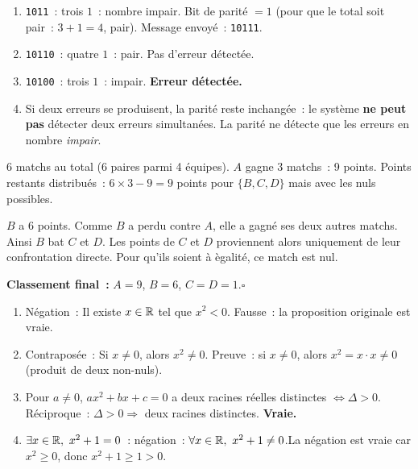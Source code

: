 
\begin{enumerate}
  \item \texttt{1011}~: trois $1$~: nombre impair. Bit de parit\'e $= 1$
        (pour que le total soit pair~: $3+1=4$, pair).
        Message envoy\'e~: \texttt{10111}.
  \item \texttt{10110}~: quatre $1$~: pair. Pas d'erreur d\'etect\'ee.
  \item \texttt{10100}~: trois $1$~: impair. \textbf{Erreur d\'etect\'ee.}
  \item Si deux erreurs se produisent, la parit\'e reste inchang\'ee~:
        le syst\`eme \textbf{ne peut pas} d\'etecter deux erreurs simultan\'ees.
        La parit\'e ne d\'etecte que les erreurs en nombre \emph{impair}.
\end{enumerate}


6 matchs au total (6 paires parmi 4 \'equipes). $A$ gagne 3 matchs~: 9 points.
Points restants distribu\'es~: $6\times3-9=9$ points pour $\{B,C,D\}$
mais avec les nuls possibles.

$B$ a 6 points. Comme $B$ a perdu contre $A$, elle a gagn\'e ses deux autres
matchs. Ainsi $B$ bat $C$ et $D$. Les points de $C$ et $D$ proviennent alors
uniquement de leur confrontation directe. Pour qu'ils soient \`a \`egalit\'e,
ce match est nul.

\textbf{Classement final~:} $A=9$, $B=6$, $C=D=1$.\hfill$\square$


\begin{enumerate}
  \item N\'egation~: \og Il existe $x\in\mathbb{R}$ tel que $x^2<0$.\fg
        Fausse~: la proposition originale est vraie.
  \item Contrapos\'ee~: \og Si $x\ne0$, alors $x^2\ne0$.\fg
        Preuve~: si $x\ne0$, alors $x^2=x\cdot x\ne0$ (produit de deux non-nuls).
  \item Pour $a\ne0$, $ax^2+bx+c=0$ a deux racines r\'eelles distinctes
        $\Leftrightarrow\Delta>0$.
        R\'eciproque~: $\Delta>0\Rightarrow$ deux racines distinctes. \textbf{Vraie.}
  \item \og$\exists x\in\mathbb{R},\ x^2+1=0$\fg~: n\'egation~:
        \og$\forall x\in\R,\ x^2+1\ne0$.\fg La n\'egation est vraie
        car $x^2\geq0$, donc $x^2+1\geq1>0$.
\end{enumerate}

